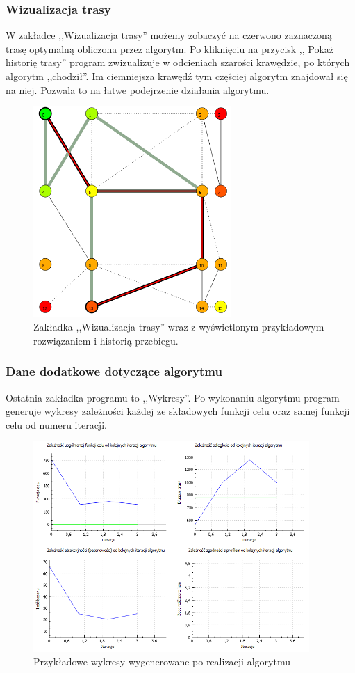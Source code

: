 \documentclass[12pt,a4paper]{article}
\begin{document}
\subsubsection{Wizualizacja trasy}
W zakładce ,,Wizualizacja trasy'' możemy zobaczyć na czerwono zaznaczoną trasę optymalną obliczona przez algorytm. Po kliknięciu na przycisk ,, Pokaż historię trasy'' program zwizualizuje w odcieniach szarości krawędzie, po których algorytm ,,chodził''. Im ciemniejsza krawędź tym częściej algorytm znajdował się na niej. Pozwala to na łatwe podejrzenie działania algorytmu.
\begin{figure}[!h]
	\centering
	\includegraphics[height=80mm]{./ilustracje/screen4.png}
	\caption{Zakładka ,,Wizualizacja trasy'' wraz z wyświetlonym przykładowym rozwiązaniem i historią przebiegu.}
\end{figure}
\subsubsection{Dane dodatkowe dotyczące algorytmu}
Ostatnia zakładka programu to ,,Wykresy''. Po wykonaniu algorytmu program generuje wykresy zależności każdej ze składowych funkcji celu oraz samej funkcji celu od numeru iteracji.
\begin{figure}[!h]
	\centering
	\includegraphics[height=80mm]{./ilustracje/screen5.png}
	\caption{Przykładowe wykresy wygenerowane po realizacji algorytmu}
\end{figure}
\end{document}
